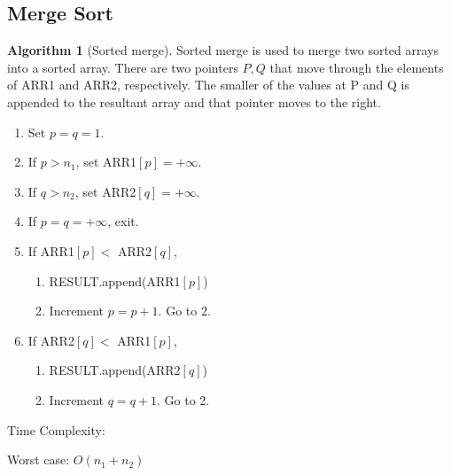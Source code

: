 \documentclass[10pt, a4paper]{extarticle}
\theoremstyle{definition}
\newtheorem{alg}{Algorithm}
\begin{document}
\subsection{Merge Sort}
\begin{alg}[Sorted merge]
	Sorted merge is used to merge two sorted arrays into a sorted array. There are two pointers $P,Q$ that move through the elements of ARR1 and ARR2, respectively. The smaller of the values at P and Q is appended to the resultant array and that pointer moves to the right.
	\begin{enumerate}
		\item Set $p=q=1$.
		\item If $p>n_1$, set ARR1$[p]=+\infty$.
		\item If $q>n_2$, set ARR2$[q]=+\infty$.
		\item If $p=q=+\infty$, exit.
		\item If ARR1$[p]<$ ARR2$[q]$,
		      \begin{enumerate}
			      \item RESULT.append(ARR1$[p]$)
			      \item Increment $p=p+1$. Go to 2.
		      \end{enumerate}
		\item If ARR2$[q]<$ ARR1$[p]$,
		      \begin{enumerate}
			      \item RESULT.append(ARR2$[q]$)
			      \item Increment $q=q+1$. Go to 2.
		      \end{enumerate}
	\end{enumerate}
	Time Complexity:

	Worst case: $O(n_1+ n_2)$
\end{alg}
\end{document}
